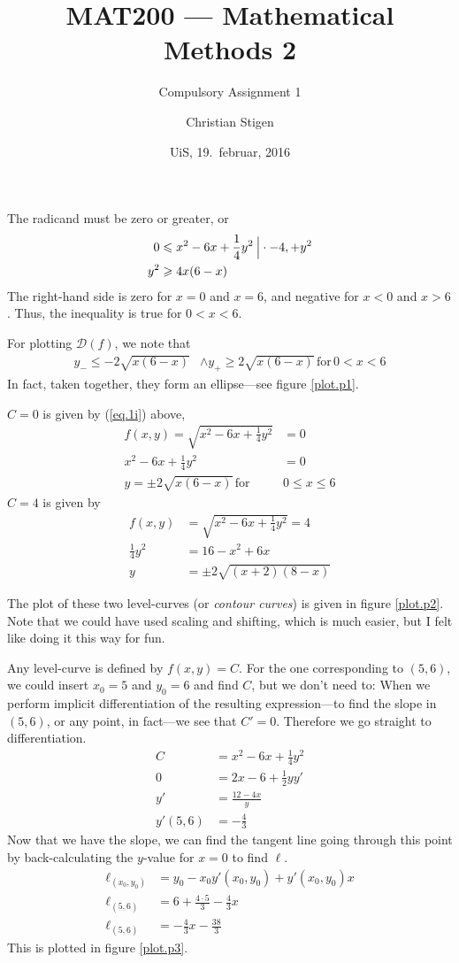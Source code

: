 \documentclass[a4paper,norsk,12pt]{article}
\title{MAT200 --- Mathematical Methods 2}
\subtitle{Compulsory Assignment 1}
\author{Christian Stigen}
\date{UiS, 19.~februar, 2016}
\begin{document}
\maketitle
{}
The radicand must be zero or greater, or
\begin{align*}
  0 & \leqslant x^2-6x+\frac{1}{4}y^2 \> \Big{|} \cdot-4, +y^2 \\
  y^2 & \geqslant 4x(6-x)
\end{align*}
The right-hand side is zero for $x=0$ and $x=6$, and negative for $x<0$
and $x>6$. Thus, the inequality is true for $0 < x < 6$.

For plotting $\mathcal{D}(f)$, we note that
  \begin{align}
    y_{-} \leqslant -2\sqrt{x(6-x)} & \wedge y_{+} \geqslant 2\sqrt{x(6-x)}
    \,\text{for}\, 0<x<6 \label{eq.1i}
  \end{align}
In fact, taken together, they form an ellipse---see figure \vref{plot.p1}.


$C=0$ is given by (\ref{eq.1i}) above,
\begin{align*}
  f(x,y) = \sqrt{x^2 - 6x + \frac{1}{4}y^2} &= 0\\
  x^2 - 6x + \frac{1}{4}y^2 &= 0\\
  y = \pm2\sqrt{x(6-x)} \, \text{for} \, &0 \leqslant x \leqslant 6
\end{align*}
$C=4$ is given by
\begin{align*}
  f(x,y) &= \sqrt{x^2 - 6x + \frac{1}{4}y^2} = 4\\
  \frac{1}{4}y^2 &= 16 - x^2 + 6x\\
  y &= \pm2\sqrt{(x+2)(8-x)}
\end{align*}

The plot of these two level-curves (or \textit{contour curves}) is given in
figure \vref{plot.p2}. Note that we could have used scaling and shifting, which
is much easier, but I felt like doing it this way for fun.

Any level-curve is defined by $f(x,y)=C$. For the one corresponding to $(5,6)$,
we could insert $x_0=5$ and $y_0=6$ and find $C$, but we don't need to: When we
perform implicit differentiation of the resulting expression---to find the
slope in $(5,6)$, or any point, in fact---we see that $C'=0$. Therefore we go
straight to differentiation.
\begin{align*}
  C &= x^2 - 6x + \frac{1}{4}y^2 \\
  0 &= 2x - 6 + \frac{1}{2}yy' \\
  y' &= \frac{12-4x}{y} \\
  y'(5,6) &= -\frac{4}{3}
\end{align*}
Now that we have the slope, we can find the tangent line going through this
point by back-calculating the $y$-value for $x=0$ to find $\ell$.
\begin{align*}
  \ell_{(x_0, y_0)} &= y_0 - x_0y'(x_0,y_0) + y'(x_0,y_0)x \\
  \ell_{(5,6)} &= 6+\frac{4\cdot5}{3} -\frac{4}{3}x \\
  \ell_{(5,6)} &= -\frac{4}{3}x -\frac{38}{3}
\end{align*}
This is plotted in figure \vref{plot.p3}.
\end{document}
